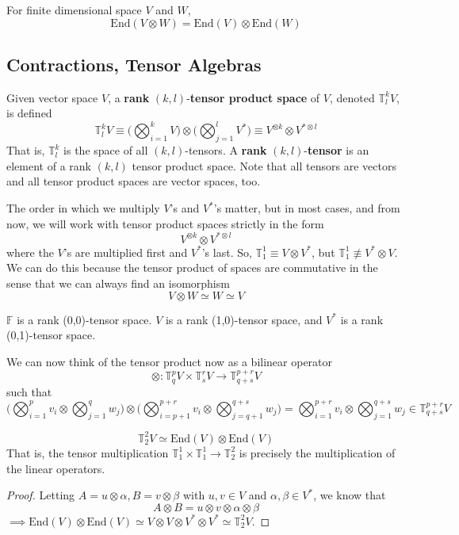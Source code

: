   \begin{proposition}
  For finite dimensional space $V$ and $W$, 
  \[\text{End}(V \otimes W) = \text{End}(V) \otimes \text{End}(W)\]
  \end{proposition}

\subsection{Contractions, Tensor Algebras}

  \begin{definition}
  Given vector space $V$, a \textbf{rank }$(k, l)$-\textbf{tensor product space} of $V$, denoted $\mathbb{T}^{k}_{l} V$, is defined
  \[ \mathbb{T}^k_l V \equiv \bigg( \bigotimes_{i=1}^{k} V \bigg) \otimes \bigg( \bigotimes_{j=1}^{l} V^{*} \bigg) \equiv V^{\otimes k} \otimes V^{* \otimes l}\]
  That is, $\mathbb{T}^{k}_{l}$ is the space of all $(k, l)$-tensors. A \textbf{rank }$(k, l)$-\textbf{tensor} is an element of a rank $(k, l)$ tensor product space. Note that all tensors are vectors and all tensor product spaces are vector spaces, too. 

  The order in which we multiply $V$'s and $V^*$'s matter, but in most cases, and from now, we will work with tensor product spaces strictly in the form 
  \[ V^{\otimes k} \otimes V^{* \otimes l} \]
  where the $V$'s are multiplied first and $V^*$'s last. So, $\mathbb{T}^{1}_{1} \equiv V \otimes V^*$, but $\mathbb{T}^{1}_{1} \not\equiv V^* \otimes V$. We can do this because the tensor product of spaces are commutative in the sense that we can always find an isomorphism
  \[V \otimes W \simeq W \simeq V\]
  \end{definition}

  \begin{example}
  $\mathbb{F}$ is a rank (0,0)-tensor space. $V$ is a rank (1,0)-tensor space, and $V^{*}$ is a rank (0,1)-tensor space. 
  \end{example}

  We can now think of the tensor product now as a bilinear operator
  \[\otimes: \mathbb{T}^p_q V \times \mathbb{T}^r_s V \longrightarrow \mathbb{T}^{p+r}_{q+s} V\]
  such that
  \[\bigg( \bigotimes_{i=1}^p v_i \otimes \bigotimes_{j=1}^q w_j \bigg) \otimes \bigg( \bigotimes_{i = p+1}^{p+r} v_i \otimes \bigotimes_{j=q+1}^{q+s} w_j \bigg) = \bigotimes_{i=1}^{p+r} v_i \otimes \bigotimes_{j=1}^{q+s} w_j \in \mathbb{T}^{p+r}_{q+s} V\]

  \begin{proposition}
  \[\mathbb{T}^2_2 V \simeq \text{End}(V) \otimes \text{End}(V)\]
  That is, the tensor multiplication $\mathbb{T}^1_1 \times \mathbb{T}^1_1 \longrightarrow \mathbb{T}^2_2$ is precisely the multiplication of the linear operators. 
  \end{proposition}
  \begin{proof}
  Letting $A = u \otimes \alpha, B = v \otimes \beta$ with $u, v \in V$ and $\alpha, \beta \in V^*$, we know that
  \[A \otimes B = u \otimes v \otimes \alpha \otimes \beta\]
  $\implies \text{End}(V) \otimes \text{End}(V) \simeq V \otimes V \otimes V^* \otimes V^* \simeq \mathbb{T}^2_2 V$. 
  \end{proof}

